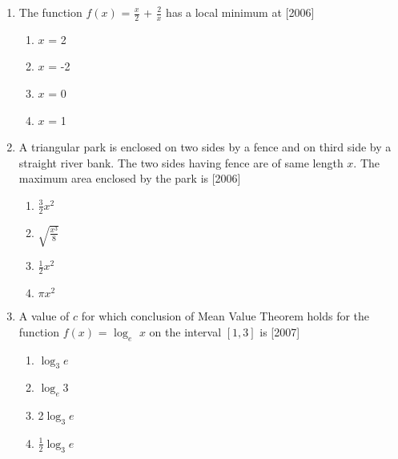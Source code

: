 \documentclass[journal,12pt,onecolumn]{IEEEtran}
\theoremstyle{remark}
\begin{document}
\begin{enumerate}
\begin{enumerate}
        \end{enumerate}
        
            
        \item The function $f(x)$ = $\frac{x}{2}$ + $\frac{2}{x}$ has a local minimum at \hfill[2006]
         \begin{multicols}{4}
        \begin{enumerate}
        
            
        
         \item $x$ = 2
        \item $x$ = -2
        \item $x$ = 0
        \item $x$ = 1
        
            
        \end{enumerate}
        \end{multicols}
            
        \item A triangular park is enclosed on two sides by a fence and on third side by a straight river bank. The two sides having fence are of same length $x$. The maximum area enclosed by the park is \hfill[2006]
         \begin{multicols}{4}
        \begin{enumerate}
        
            
  
            
        
            \item $\frac{3}{2}$$x^2$
        \item $\sqrt{\frac{x^3}{8}}$
        \item $\frac{1}{2}$$x^2$
        \item $\pi$$x^2$
    
        \end{enumerate}
        \end{multicols}
            
        \item A value of $c$ for which conclusion of Mean Value Theorem holds for the function $f(x)$ = $\log_e$ $x$ on the interval $[1,3]$ is \hfill[2007]
         \begin{multicols}{4}
        \begin{enumerate}
        
            
        
            \item $\log_3$$e$
        \item $\log_e$3
        \item 2$\log_3$$e$
        \item $\frac{1}{2}$$\log_3$$e$


\end{enumerate}
\end{multicols}
\end{enumerate}
\end{document}

